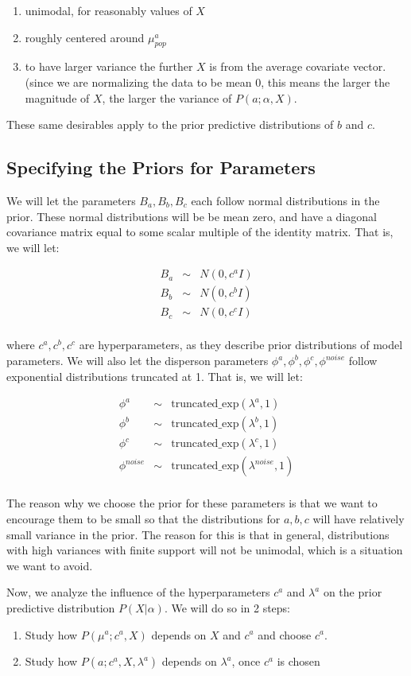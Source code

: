 \begin{enumerate}
  \item unimodal, for reasonably values of $X$
  \item roughly centered around $\mu_{pop}^a$
  \item to have larger variance the further $X$ is from the average covariate vector.  (since we are normalizing the data to be mean 0, this means the larger the magnitude of $X$, the larger the variance of $P(a;\alpha,X)$.
\end{enumerate}

These same desirables apply to the prior predictive distributions of $b$ and $c$.

\subsection{Specifying the Priors for Parameters}

We will let the parameters $B_a,B_b,B_c$ each follow normal distributions in the prior.  These normal distributions will be be mean zero, and have a diagonal covariance matrix equal to some scalar multiple of the identity matrix.  That is, we will let:

\begin{eqnarray}
  B_a &\sim& N(0, c^aI) \\
  B_b &\sim& N(0, c^bI) \\ 
  B_c &\sim& N(0, c^cI) \\
\end{eqnarray}

where $c^a,c^b,c^c$ are hyperparameters, as they describe prior distributions of model parameters.  We will also let the disperson parameters $\phi^a,\phi^b,\phi^c,\phi^{noise}$ follow exponential distributions truncated at 1.  That is, we will let:

\begin{eqnarray}
  \phi^a &\sim& \textrm{truncated\_exp}(\lambda^a, 1) \\
  \phi^b &\sim& \textrm{truncated\_exp}(\lambda^b, 1) \\ 
  \phi^c &\sim& \textrm{truncated\_exp}(\lambda^c, 1) \\
  \phi^{noise} &\sim& \textrm{truncated\_exp}(\lambda^{noise}, 1) \\
\end{eqnarray}

The reason why we choose the prior for these parameters is that we want to encourage them to be small so that the distributions for $a,b,c$ will have relatively small variance in the prior.  The reason for this is that in general, distributions with high variances with finite support will not be unimodal, which is a situation we want to avoid.

Now, we analyze the influence of the hyperparameters $c^a$ and $\lambda^a$ on the prior predictive distribution $P(X|\alpha)$.  We will do so in 2 steps: 
\begin{enumerate}
\item Study how $P(\mu^a;c^a,X)$ depends on $X$ and $c^a$ and choose $c^a$.
\item Study how $P(a;c^a,X,\lambda^a)$ depends on $\lambda^a$, once $c^a$ is chosen
\end{enumerate}


